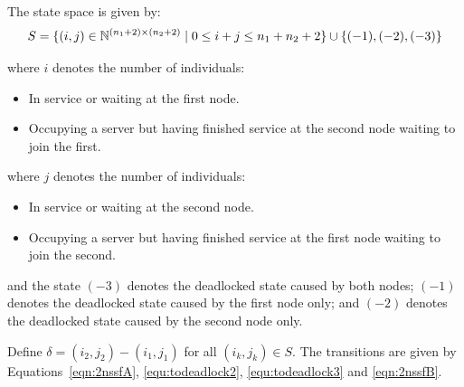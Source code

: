 \documentclass{article}
\numberwithin{equation}{section}
\begin{document}
The state space is given by:
    \[S = \{(i,j)\in\mathbb{N}^{(n_1+2)\times (n_2+2)} \nonscript\; | \nonscript\; 0 \leq i + j \leq n_1 + n_2 + 2
    \}\cup\{(-1), (-2), (-3)\}\]

    where \(i\) denotes the number of individuals:
        \begin{itemize}
            \item In service or waiting at the first node.
            \item Occupying a server but having finished service at the
                second node waiting to join the first.
        \end{itemize}
    where \(j\) denotes the number of individuals:
        \begin{itemize}
            \item In service or waiting at the second node.
            \item Occupying a server but having finished service at the
                first node waiting to join the second.
        \end{itemize}
    and the state $(-3)$ denotes the deadlocked state caused by both nodes;
    $(-1)$ denotes the deadlocked state caused by the first node only; and
    $(-2)$ denotes the deadlocked state caused by the second node only.

Define $\delta = (i_2, j_2) - (i_1, j_1)$ for all $(i_k, j_k) \in S$.
The transitions are given by Equations~\ref{eqn:2nssfA}, \ref{equ:todeadlock2},
\ref{equ:todeadlock3} and \ref{eqn:2nssfB}.
\end{document}
